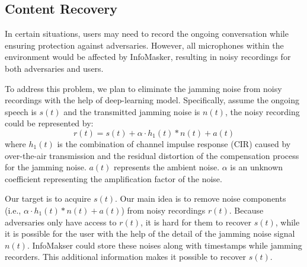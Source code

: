 \begin{table}[t]
    \centering
    
    \caption{Normalized max transmission energy.}
    \label{tab:self_demodulation}
    \vspace{-5mm}
\end{table}

\subsection{Content Recovery}
In certain situations, users may need to record the ongoing conversation while ensuring protection against adversaries. However, all microphones within the environment would be affected by InfoMasker, resulting in noisy recordings for both adversaries and users. 

To address this problem, we plan to eliminate the jamming noise from noisy recordings with the help of deep-learning model. Specifically, assume the ongoing speech is $s(t)$ and the transmitted jamming noise is $n(t)$, the noisy recording could be represented by:
$$
r(t) = s(t) + \alpha \cdot h_{1}(t) \ast n(t) + a(t)
$$
where $h_{1}(t)$ is the combination of channel impulse response (CIR) caused by over-the-air transmission and the residual distortion of the compensation process for the jamming noise. $a(t)$ represents the ambient noise. $\alpha$ is an unknown coefficient representing the amplification factor of the noise. 

Our target is to acquire $s(t)$. Our main idea is to remove noise components (i.e., $\alpha \cdot h_{1}(t)\ast n(t) + a(t)$) from noisy recordings $r(t)$. Because adversaries only have access to $r(t)$, it is hard for them to recover $s(t)$, while it is possible for the user with the help of the detail of the jamming noise signal $n(t)$. InfoMakser could store these noises along with timestamps while jamming recorders. This additional information makes it possible to recover $s(t)$.

